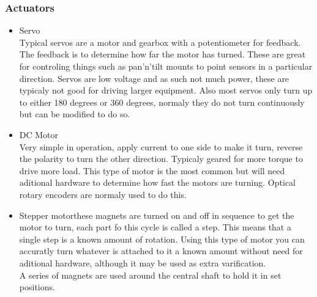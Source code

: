 \documentclass[11pt,fleqn,twoside]{article}
\begin{document}
\subsubsection{Actuators}
\begin{itemize}
\item Servo
\\Typical servos are a motor and gearbox with a potentiometer for feedback.  The feedback is to determine how far the motor has turned.  These are great for controling things such as pan'n'tilt mounts to point sensors in a particular direction.  Servos are low voltage and as such not much power, these are typicaly not good for driving larger equipment.  Also most servos only turn up to either 180 degrees or 360 degrees, normaly they do not turn continuously but can be modified to do so.
\item DC Motor
\\Very simple in operation, apply current to one side to make it turn, reverse the polarity to turn the other direction.  Typicaly geared for more torque to drive more load.  This type of motor is the most common but will need aditional hardware to determine how fast the motors are turning.  Optical rotary encoders are normaly used to do this.
\item Stepper motorthese magnets are turned on and off in sequence to get the motor to turn, each part fo this cycle is called a step.  This means that a single step is a known amount of rotation.  Using this type of motor you can accuratly turn whatever is attached to it a known amount without need for aditional hardware, although it may be used as extra varification.
\\A series of magnets are used around the central shaft to hold it in set positions.
\end{itemize}
\end{document}

